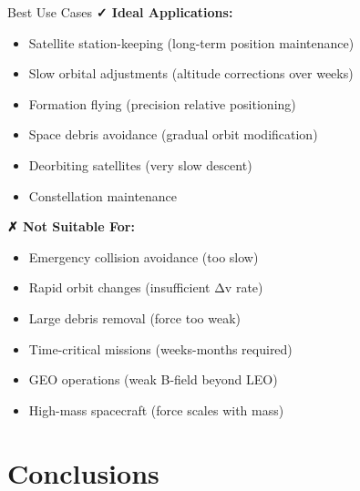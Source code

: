 \documentclass[aspectratio=169]{beamer}
\begin{document}
\begin{frame}{Best Use Cases}
\textbf{✓ Ideal Applications:}
\begin{itemize}
    \item Satellite station-keeping (long-term position maintenance)
    \item Slow orbital adjustments (altitude corrections over weeks)
    \item Formation flying (precision relative positioning)
    \item Space debris avoidance (gradual orbit modification)
    \item Deorbiting satellites (very slow descent)
    \item Constellation maintenance
\end{itemize}

\vspace{1em}
\textbf{✗ Not Suitable For:}
\begin{itemize}
    \item Emergency collision avoidance (too slow)
    \item Rapid orbit changes (insufficient Δv rate)
    \item Large debris removal (force too weak)
    \item Time-critical missions (weeks-months required)
    \item GEO operations (weak B-field beyond LEO)
    \item High-mass spacecraft (force scales with mass)
\end{itemize}
\end{frame}

\section{Conclusions}
\end{document}
